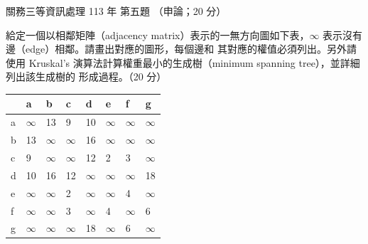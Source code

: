 \begin{pastexam}[label={px:gw3-113-ds-05}]{關務三等資訊處理 113 年 第五題}
（申論；20 分）

給定一個以相鄰矩陣（adjacency matrix）表示的一無方向圖如下表，$\infty$ 表示沒有邊（edge）相鄰。請畫出對應的圖形，每個邊和
其對應的權值必須列出。另外請使用 Kruskal's 演算法計算權重最小的生成樹（minimum spanning tree），並詳細列出該生成樹的
形成過程。（20 分）
\begin{center}
\begin{tabular}{|l|l|l|l|l|l|l|l|}
\hline
 & a & b & c & d & e & f & g \\ \hline
a & $\infty$ & 13 & 9 & 10 & $\infty$ & $\infty$ & $\infty$ \\ \hline
b & 13 & $\infty$ & $\infty$ & 16 & $\infty$ & $\infty$ & $\infty$ \\ \hline
c & 9 & $\infty$ & $\infty$ & 12 & 2 & 3 & $\infty$ \\ \hline
d & 10 & 16 & 12 & $\infty$ & $\infty$ & $\infty$ & 18 \\ \hline
e & $\infty$ & $\infty$ & 2 & $\infty$ & $\infty$ & 4 & $\infty$ \\ \hline
f & $\infty$ & $\infty$ & 3 & $\infty$ & 4 & $\infty$ & 6 \\ \hline
g & $\infty$ & $\infty$ & $\infty$ & 18 & $\infty$ & 6 & $\infty$ \\ \hline
\end{tabular}
\end{center}
\end{pastexam}

